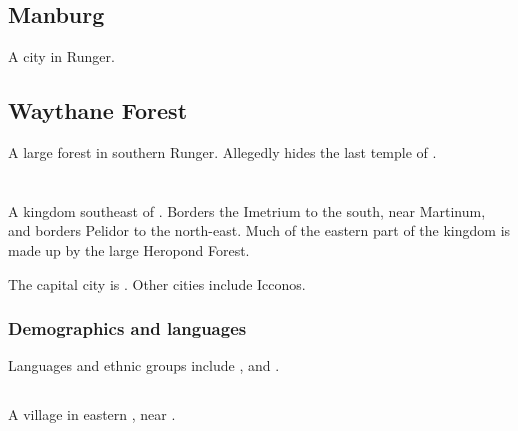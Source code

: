 \subsection{Manburg}
A city in Runger. 









\subsection{Waythane Forest}
A large forest in southern Runger. Allegedly hides the last temple of . 















\section[Scyrum]{\Scyrum}
\index{\Scyrum}
A kingdom southeast of \Velcad{}. 
Borders the Imetrium to the south, near Martinum, and borders Pelidor to the north-east. 
Much of the eastern part of the kingdom is made up by the large Heropond Forest. 

The capital city is . 
Other cities include Icconos. 





\subsubsection{Demographics and languages}
Languages and ethnic groups include \Tepharin, \Samurin{} and \Ortic. 









\subsection{\Bryndwin}
\index{\Bryndwin}
A village in eastern \Scyrum, near . 









